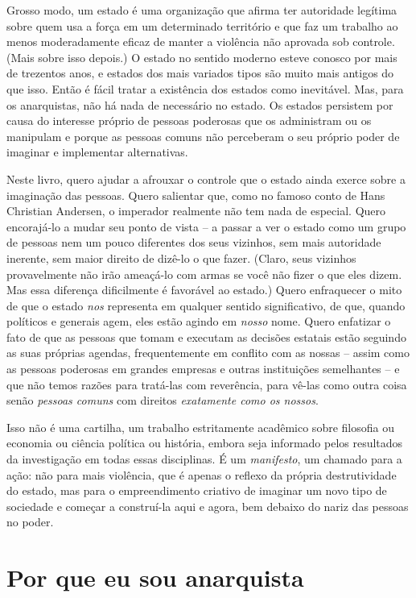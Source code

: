 Grosso modo, um estado é uma organização que afirma ter autoridade legítima sobre quem usa a força em um determinado território e que faz um trabalho ao menos moderadamente eficaz de manter a violência não aprovada sob controle. (Mais sobre isso depois.) O estado no sentido moderno esteve conosco por mais de trezentos anos, e estados dos mais variados tipos são muito mais antigos do que isso. Então é fácil tratar a existência dos estados como inevitável. Mas, para os anarquistas, não há nada de necessário no estado. Os estados persistem por causa do interesse próprio de pessoas poderosas que os administram ou os manipulam e porque as pessoas comuns não perceberam o seu próprio poder de imaginar e implementar alternativas.

Neste livro, quero ajudar a afrouxar o controle que o estado ainda exerce sobre a imaginação das pessoas. Quero salientar que, como no famoso conto de Hans Christian Andersen, o imperador realmente não tem nada de especial. Quero encorajá-lo a mudar seu ponto de vista -- a passar a ver o estado como um grupo de pessoas nem um pouco diferentes dos seus vizinhos, sem mais autoridade inerente, sem maior direito de dizê-lo o que fazer. (Claro, seus vizinhos provavelmente não irão ameaçá-lo com armas se você não fizer o que eles dizem. Mas essa diferença dificilmente é favorável ao estado.) Quero enfraquecer o mito de que o estado \emph{nos} representa em qualquer sentido significativo, de que, quando políticos e generais agem, eles estão agindo em \emph{nosso} nome. Quero enfatizar o fato de que as pessoas que tomam e executam as decisões estatais estão seguindo as suas próprias agendas, frequentemente em conflito com as nossas -- assim como as pessoas poderosas em grandes empresas e outras instituições semelhantes -- e que não temos razões para tratá-las com reverência, para vê-las como outra coisa senão \emph{pessoas comuns} com direitos \emph{exatamente como os nossos}.

Isso não é uma cartilha, um trabalho estritamente acadêmico sobre filosofia ou economia ou ciência política ou história, embora seja informado pelos resultados da investigação em todas essas disciplinas. É um \emph{manifesto}, um chamado para a ação: não para mais violência, que é apenas o reflexo da própria destrutividade do estado, mas para o empreendimento criativo de imaginar um novo tipo de sociedade e começar a construí-la aqui e agora, bem debaixo do nariz das pessoas no poder.

\section{Por que eu sou anarquista}

